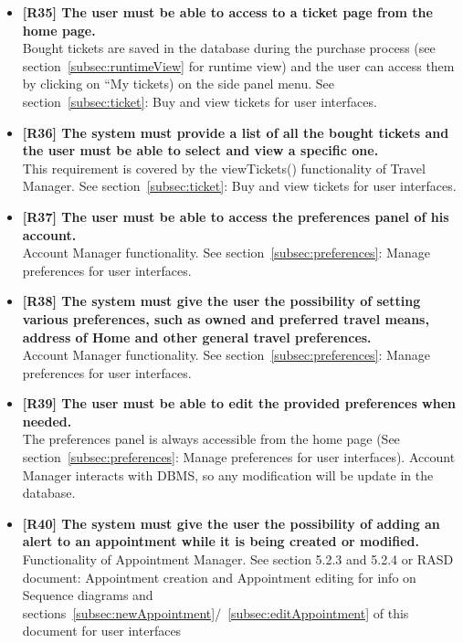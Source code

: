\begin{itemize}
\item \textbf{[R35] The user must be able to access to a ticket page from the home page.}\\
Bought tickets are saved in the database during the purchase process (see section~\ref{subsec:runtimeView} for runtime view) and the user can access them by clicking on “My tickets) on the side panel menu. See section~\ref{subsec:ticket}: Buy and view tickets for user interfaces.

\item \textbf{[R36] The system must provide a list of all the bought tickets and the user must be able to select
and view a specific one.}\\
This requirement is covered by the viewTickets() functionality of Travel Manager. See section~\ref{subsec:ticket}: Buy and view tickets for user interfaces.

\item \textbf{[R37] The user must be able to access the preferences panel of his account.}\\
Account Manager functionality. See section~\ref{subsec:preferences}: Manage preferences for user interfaces.

\item \textbf{[R38] The system must give the user the possibility of setting various preferences, such as owned
and preferred travel means, address of Home and other general travel preferences.}\\
Account Manager functionality. See section~\ref{subsec:preferences}: Manage preferences for user interfaces.

\item \textbf{[R39] The user must be able to edit the provided preferences when needed.}\\
The preferences panel is always accessible from the home page (See section~\ref{subsec:preferences}: Manage preferences for user interfaces). Account Manager interacts with DBMS, so any modification will be update in the database.

\item \textbf{[R40] The system must give the user the possibility of adding an alert to an appointment while it is being created or modified.}\\
Functionality of Appointment Manager. See section 5.2.3 and 5.2.4 or RASD document: Appointment creation and Appointment editing for info on Sequence diagrams and sections~\ref{subsec:newAppointment}/~\ref{subsec:editAppointment} of this document for user interfaces


\end{itemize}
